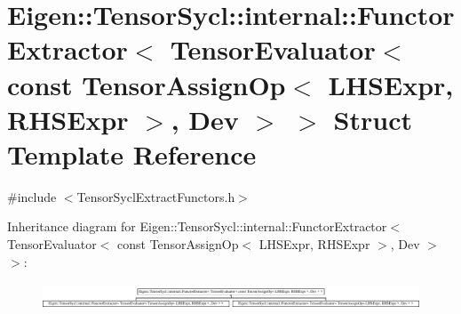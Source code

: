 \hypertarget{struct_eigen_1_1_tensor_sycl_1_1internal_1_1_functor_extractor_3_01_tensor_evaluator_3_01const_0bfc9e0269848e71715a5b777eed1a2f8}{}\section{Eigen\+:\+:Tensor\+Sycl\+:\+:internal\+:\+:Functor\+Extractor$<$ Tensor\+Evaluator$<$ const Tensor\+Assign\+Op$<$ L\+H\+S\+Expr, R\+H\+S\+Expr $>$, Dev $>$ $>$ Struct Template Reference}
\label{struct_eigen_1_1_tensor_sycl_1_1internal_1_1_functor_extractor_3_01_tensor_evaluator_3_01const_0bfc9e0269848e71715a5b777eed1a2f8}


{\ttfamily \#include $<$Tensor\+Sycl\+Extract\+Functors.\+h$>$}

Inheritance diagram for Eigen\+:\+:Tensor\+Sycl\+:\+:internal\+:\+:Functor\+Extractor$<$ Tensor\+Evaluator$<$ const Tensor\+Assign\+Op$<$ L\+H\+S\+Expr, R\+H\+S\+Expr $>$, Dev $>$ $>$\+:\begin{figure}[H]
\begin{center}
\leavevmode
\includegraphics[height=0.792079cm]{struct_eigen_1_1_tensor_sycl_1_1internal_1_1_functor_extractor_3_01_tensor_evaluator_3_01const_0bfc9e0269848e71715a5b777eed1a2f8}
\end{center}
\end{figure}
